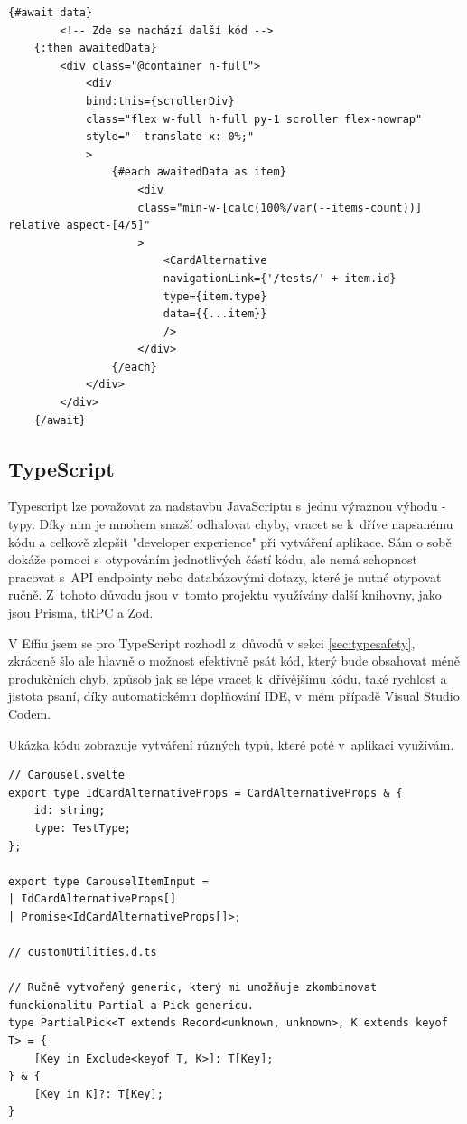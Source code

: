 \documentclass[12pt, a4paper,
openright
]{report}
\begin{document}
\begin{enumerate}
	\begin{lstlisting}[style=ES6, caption=Ukázka Svelte kódu, label=svelte-sample]
	{#await data}
		<!-- Zde se nachází další kód -->
	{:then awaitedData}
		<div class="@container h-full">
			<div
			bind:this={scrollerDiv}
			class="flex w-full h-full py-1 scroller flex-nowrap"
			style="--translate-x: 0%;"
			>
				{#each awaitedData as item}
					<div
					class="min-w-[calc(100%/var(--items-count))] relative aspect-[4/5]"
					>
						<CardAlternative
						navigationLink={'/tests/' + item.id}
						type={item.type}
						data={{...item}}
						/>
					</div>
				{/each}
			</div>
		</div>
	{/await}
	\end{lstlisting}
\end{enumerate}

\subsection{TypeScript}
Typescript lze považovat za nadstavbu JavaScriptu s~jednu výraznou výhodu - typy. Díky nim je mnohem snazší odhalovat chyby, vracet se k~dříve napsanému kódu a celkově zlepšit "developer experience" při vytváření aplikace. Sám o sobě dokáže pomoci s~otypováním jednotlivých částí kódu, ale nemá schopnost pracovat s~API endpointy nebo databázovými dotazy, které je nutné otypovat ručně. Z~tohoto důvodu jsou v~tomto projektu využívány další knihovny, jako jsou Prisma, tRPC a Zod.

V Effiu jsem se pro TypeScript rozhodl z~důvodů v sekci \ref{sec:typesafety}, zkráceně šlo ale hlavně o možnost efektivně psát kód, který bude obsahovat méně produkčních chyb, způsob jak se lépe vracet k~dřívějšímu kódu, také rychlost a jistota psaní, díky automatickému doplňování IDE, v~mém případě Visual Studio Codem.

Ukázka kódu zobrazuje vytváření různých typů, které poté v~aplikaci využívám.

\begin{lstlisting}[style=ES6, caption=Ukázka TypeScriptového typu, label=typescript-sample]
// Carousel.svelte
export type IdCardAlternativeProps = CardAlternativeProps & {
	id: string;
	type: TestType;
};

export type CarouselItemInput =
| IdCardAlternativeProps[]
| Promise<IdCardAlternativeProps[]>;

// customUtilities.d.ts

// Ručně vytvořený generic, který mi umožňuje zkombinovat funckionalitu Partial a Pick genericu. 
type PartialPick<T extends Record<unknown, unknown>, K extends keyof T> = {
	[Key in Exclude<keyof T, K>]: T[Key];
} & {
	[Key in K]?: T[Key];
}
\end{lstlisting}
\end{document}
